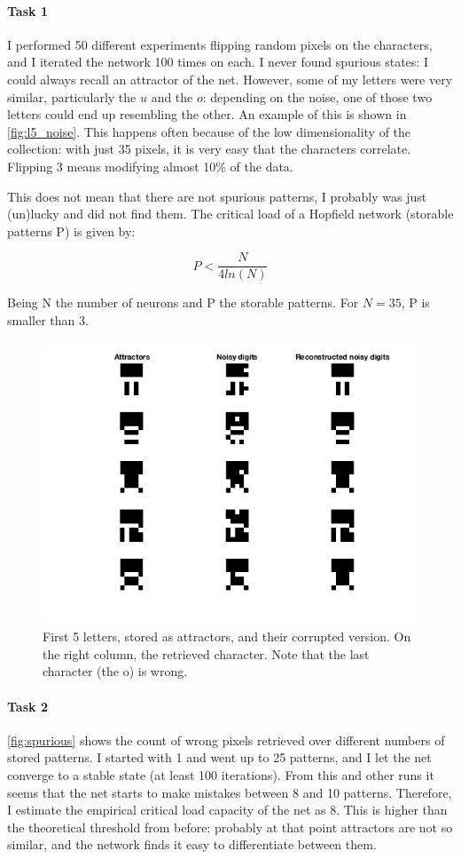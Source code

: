 \documentclass[a4paper, 10pt]{article}
\begin{document}
\paragraph{Task 1} I performed 50 different experiments flipping random pixels 
on the characters, and I iterated the network 100 times on each. I never found 
spurious states: I could
always recall an attractor of the net. However, some of my letters were very similar,
particularly the $u$ and the $o$: depending on the noise, one of those two letters
could end up resembling the other. An example of this is shown in 
\autoref{fig:l5_noise}. This happens often because of the low dimensionality of
the collection: with just 35 pixels, it is very easy that the characters correlate.
Flipping 3 means modifying almost 10\% of the data.

This does not mean that there are not spurious patterns, I probably was just 
(un)lucky and did not find them. The critical load of
a Hopfield network (storable patterns P) is given by:

$$ P < \frac{N}{4ln(N)} $$

Being N the number of neurons and P the storable patterns. For $N=35$, P is 
smaller than 3.


\begin{figure}[htb]
  \centering
  \includegraphics[width=0.7\linewidth]{./project/letters/attractors.png}
  \caption{First 5 letters, stored as attractors, and their corrupted version. 
  On the right column, the retrieved character. Note that the last character
(the o) is wrong.}
  \label{fig:l5_noise}
\end{figure}

\paragraph{Task 2} \autoref{fig:spurious} shows the count of wrong pixels retrieved
over different numbers of stored patterns. I started with 1 and went up to 25 
patterns, and I let the net converge to a stable state (at least 100 iterations). 
From this and other runs it seems that the net starts to make mistakes between
8 and 10 patterns. Therefore, I estimate the empirical critical load capacity
of the net as 8. This is higher than the theoretical threshold from before:
probably at that point attractors are not so similar, and the network finds
it easy to differentiate between them.
\end{document}
